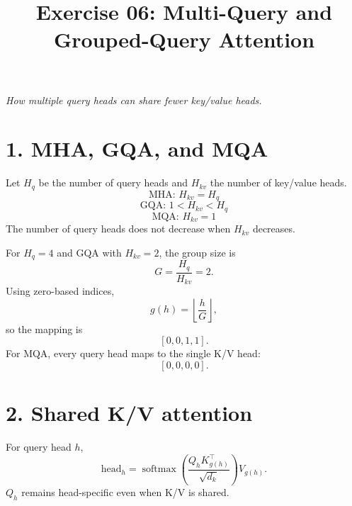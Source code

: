\documentclass[11pt]{article}
\title{\textbf{Exercise 06: Multi-Query and Grouped-Query Attention}}
\author{}
\date{}
\newcommand{\softmax}{\operatorname{softmax}}
\begin{document}
\maketitle

\begin{center}
\emph{How multiple query heads can share fewer key/value heads.}
\end{center}

\section*{1. MHA, GQA, and MQA}

Let $H_q$ be the number of query heads and $H_{kv}$ the number of key/value heads.
\[
\boxed{\text{MHA: }H_{kv}=H_q}
\]
\[
\boxed{\text{GQA: }1<H_{kv}<H_q}
\]
\[
\boxed{\text{MQA: }H_{kv}=1}
\]
The number of query heads does not decrease when $H_{kv}$ decreases.

For $H_q=4$ and GQA with $H_{kv}=2$, the group size is
\[
G=\frac{H_q}{H_{kv}}=2.
\]
Using zero-based indices,
\[
g(h)=\left\lfloor\frac{h}{G}\right\rfloor,
\]
so the mapping is
\[
\boxed{[0,0,1,1]}.
\]
For MQA, every query head maps to the single K/V head:
\[
\boxed{[0,0,0,0]}.
\]

\section*{2. Shared K/V attention}

For query head $h$,
\[
\boxed{
\mathrm{head}_h
=\softmax\left(
\frac{Q_hK_{g(h)}^\top}{\sqrt{d_k}}
\right)V_{g(h)}
}.
\]
$Q_h$ remains head-specific even when K/V is shared.
\end{document}
